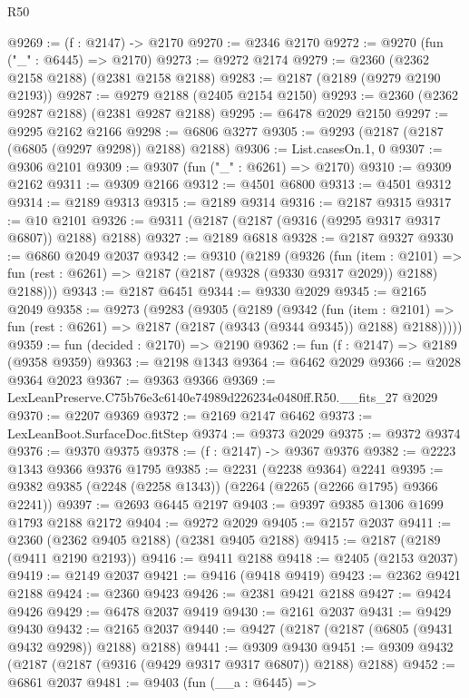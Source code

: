 \begin{lexlean}{R50}
\begin{coremodule}
@9269 := (f : @2147) -> @2170
@9270 := @2346 @2170
@9272 := @9270 (fun ("_" : @6445) => @2170)
@9273 := @9272 @2174
@9279 := @2360 (@2362 @2158 @2188) (@2381 @2158 @2188)
@9283 := @2187 (@2189 (@9279 @2190 @2193))
@9287 := @9279 @2188 (@2405 @2154 @2150)
@9293 := @2360 (@2362 @9287 @2188) (@2381 @9287 @2188)
@9295 := @6478 @2029 @2150
@9297 := @9295 @2162 @2166
@9298 := @6806 @3277
@9305 := @9293 (@2187 (@2187 (@6805 (@9297 @9298)) @2188) @2188)
@9306 := List.casesOn.{1, 0}
@9307 := @9306 @2101
@9309 := @9307 (fun ("_" : @6261) => @2170)
@9310 := @9309 @2162
@9311 := @9309 @2166
@9312 := @4501 @6800
@9313 := @4501 @9312
@9314 := @2189 @9313
@9315 := @2189 @9314
@9316 := @2187 @9315
@9317 := @10 @2101
@9326 := @9311 (@2187 (@2187 (@9316 (@9295 @9317 @9317 @6807)) @2188) @2188)
@9327 := @2189 @6818
@9328 := @2187 @9327
@9330 := @6860 @2049 @2037
@9342 := @9310
    (@2189
      (@9326
        (fun (item : @2101) =>
        fun (rest : @6261) => @2187 (@2187 (@9328 (@9330 @9317 @2029)) @2188) @2188)))
@9343 := @2187 @6451
@9344 := @9330 @2029
@9345 := @2165 @2049
@9358 := @9273
    (@9283
      (@9305
        (@2189
          (@9342
            (fun (item : @2101) =>
            fun (rest : @6261) => @2187 (@2187 (@9343 (@9344 @9345)) @2188) @2188)))))
@9359 := fun (decided : @2170) => @2190
@9362 := fun (f : @2147) => @2189 (@9358 @9359)
@9363 := @2198 @1343
@9364 := @6462 @2029
@9366 := @2028 @9364 @2023
@9367 := @9363 @9366
@9369 := LexLeanPreserve.C75b76e3c6140e74989d226234e0480ff.R50.__fits_27 @2029
@9370 := @2207 @9369
@9372 := @2169 @2147 @6462
@9373 := LexLeanBoot.SurfaceDoc.fitStep
@9374 := @9373 @2029
@9375 := @9372 @9374
@9376 := @9370 @9375
@9378 := (f : @2147) -> @9367 @9376
@9382 := @2223 @1343 @9366 @9376 @1795
@9385 := @2231 (@2238 @9364) @2241
@9395 := @9382 @9385 (@2248 (@2258 @1343)) (@2264 (@2265 (@2266 @1795) @9366 @2241))
@9397 := @2693 @6445 @2197
@9403 := @9397 @9385 @1306 @1699 @1793 @2188 @2172
@9404 := @9272 @2029
@9405 := @2157 @2037
@9411 := @2360 (@2362 @9405 @2188) (@2381 @9405 @2188)
@9415 := @2187 (@2189 (@9411 @2190 @2193))
@9416 := @9411 @2188
@9418 := @2405 (@2153 @2037)
@9419 := @2149 @2037
@9421 := @9416 (@9418 @9419)
@9423 := @2362 @9421 @2188
@9424 := @2360 @9423
@9426 := @2381 @9421 @2188
@9427 := @9424 @9426
@9429 := @6478 @2037 @9419
@9430 := @2161 @2037
@9431 := @9429 @9430
@9432 := @2165 @2037
@9440 := @9427 (@2187 (@2187 (@6805 (@9431 @9432 @9298)) @2188) @2188)
@9441 := @9309 @9430
@9451 := @9309 @9432 (@2187 (@2187 (@9316 (@9429 @9317 @9317 @6807)) @2188) @2188)
@9452 := @6861 @2037
@9481 := @9403
    (fun (__a : @6445) =>

\end{coremodule}
\end{lexlean}
